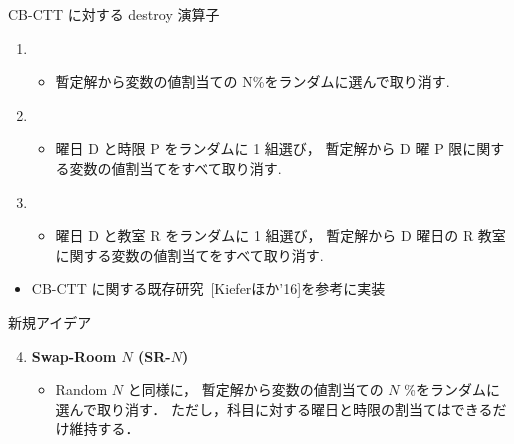 \documentclass[11pt,dvipdfmx]{beamer}
\begin{document}
\begin{frame}{CB-CTT に対する destroy 演算子}
\begin{block}{}
    \begin{enumerate}
    \item {}
      \begin{itemize}
      \item \small 暫定解から変数の値割当ての N\%をランダムに選んで取り消す.
      \end{itemize}
    \item {}
      \begin{itemize}
      \item \small 曜日 D と時限 P をランダムに 1 組選び，
      暫定解から D 曜 P 限に関する変数の値割当てをすべて取り消す.
   \end{itemize}
  \item {}
   \begin{itemize}
   \item \small 曜日 D と教室 R をランダムに 1 組選び，
   暫定解から D 曜日の R 教室に関する変数の値割当てをすべて取り消す.
   \end{itemize}
  \end{enumerate}
  \begin{itemize}
   \item \small CB-CTT に関する既存研究~[Kieferほか'16]を参考に実装
  \end{itemize}
\end{block}
   
\begin{block}{新規アイデア}
 \begin{enumerate}
 \setcounter{enumi}{3}
  \item \alert{\bf Swap-Room $N$ (SR-$N$)}
   \begin{itemize}
    \item \small Random $N$ と同様に，
    暫定解から変数の値割当ての $N$ \%をランダムに選んで取り消す．
    ただし，科目に対する曜日と時限の割当てはできるだけ維持する．
   \end{itemize}
  \end{enumerate}
\end{block}
\end{frame}
\end{document}
